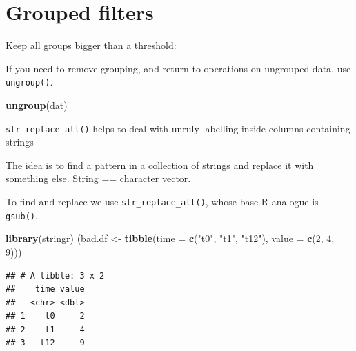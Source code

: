 \documentclass[]{book}
\newenvironment{Shaded}{\begin{snugshade}}{\end{snugshade}}
\newcommand{\KeywordTok}[1]{\textcolor[rgb]{0.13,0.29,0.53}{\textbf{#1}}}
\newcommand{\DataTypeTok}[1]{\textcolor[rgb]{0.13,0.29,0.53}{#1}}
\newcommand{\DecValTok}[1]{\textcolor[rgb]{0.00,0.00,0.81}{#1}}
\newcommand{\StringTok}[1]{\textcolor[rgb]{0.31,0.60,0.02}{#1}}
\newcommand{\OperatorTok}[1]{\textcolor[rgb]{0.81,0.36,0.00}{\textbf{#1}}}
\newcommand{\NormalTok}[1]{#1}
\begin{document}
\section{Grouped filters}\label{grouped-filters}

Keep all groups bigger than a threshold:

\begin{Shaded}
\end{Shaded}

If you need to remove grouping, and return to operations on ungrouped
data, use \texttt{ungroup()}.

\begin{Shaded}
\begin{Highlighting}[]
\KeywordTok{ungroup}\NormalTok{(dat) }
\end{Highlighting}
\end{Shaded}

\texttt{str\_replace\_all()} helps to deal with unruly labelling inside
columns containing strings

The idea is to find a pattern in a collection of strings and replace it
with something else. String == character vector.

To find and replace we use \texttt{str\_replace\_all()}, whose base R
analogue is \texttt{gsub()}.

\begin{Shaded}
\begin{Highlighting}[]
\KeywordTok{library}\NormalTok{(stringr)}
\NormalTok{(bad.df <-}\StringTok{ }\KeywordTok{tibble}\NormalTok{(}\DataTypeTok{time =} \KeywordTok{c}\NormalTok{(}\StringTok{"t0"}\NormalTok{, }\StringTok{"t1"}\NormalTok{, }\StringTok{"t12"}\NormalTok{), }\DataTypeTok{value =} \KeywordTok{c}\NormalTok{(}\DecValTok{2}\NormalTok{, }\DecValTok{4}\NormalTok{, }\DecValTok{9}\NormalTok{)))}
\end{Highlighting}
\end{Shaded}

\begin{verbatim}
## # A tibble: 3 x 2
##    time value
##   <chr> <dbl>
## 1    t0     2
## 2    t1     4
## 3   t12     9
\end{verbatim}
\end{document}
